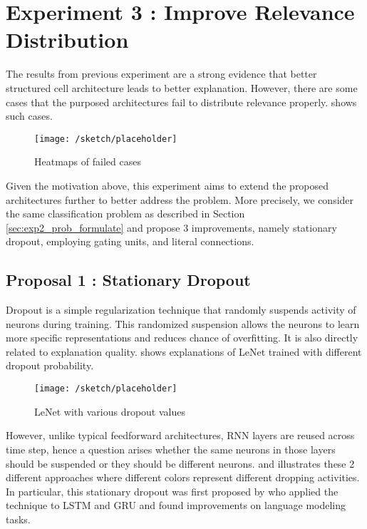 \section{Experiment 3 : Improve Relevance Distribution}
The results from previous experiment are a strong evidence that better structured cell architecture leads to better explanation. However, there are some cases that the purposed architectures fail to distribute relevance properly.  \addfigure{\ref{fig:rel_failed_cases}} shows such cases. 

\begin{figure}[h]
\centering
\texttt{[image: /sketch/placeholder]}
\caption{Heatmaps of failed cases} 
\label{fig:rel_failed_cases}  %
\end{figure}

Given the motivation above, this experiment aims to extend the proposed architectures further to better address the problem. More precisely, we consider the same classification problem as described in Section \ref{sec:exp2_prob_formulate} and propose 3 improvements, namely stationary dropout, employing gating units,  and literal connections.

\subsection{Proposal 1 :  Stationary Dropout}
Dropout is a simple regularization technique that randomly suspends activity of neurons during training. This randomized suspension allows the neurons to learn more specific representations and reduces chance of overfitting.  It is also directly related to explanation quality. \addfigure{\ref{fig:lenet_various_dropout}} shows explanations of LeNet trained with different dropout probability. 

\begin{figure}[h]
\centering
\texttt{[image: /sketch/placeholder]}
\caption{LeNet with various dropout values} 
\label{fig:lenet_various_dropout}  
\end{figure}

However, unlike typical feedforward architectures, RNN layers are reused across time step, hence a question arises whether the same neurons in those layers should be suspended or they should be different neurons. \addfigure{\ref{fig:lstm_naive_dropout}} and \addfigure{\ref{fig:lstm_variational_dropout}} illustrates these 2 different approaches where different colors represent different dropping activities. In particular, this stationary dropout was first proposed by \cite{GalTheoreticallyGroundedApplication2016} who applied  the technique to LSTM and GRU and found improvements on language modeling tasks.

